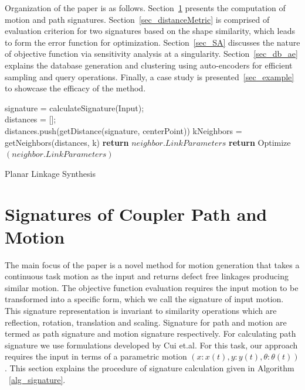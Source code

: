 \documentclass[twocolumn,10pt]{asme2e}
\begin{document}
Organization of the paper is as follows. Section~\ref{sec_sign} presents the computation of motion and path signatures.
Section~\ref{sec_distanceMetric} is comprised of evaluation criterion for two signatures based on the shape similarity, which leads to form the error function for optimization.
Section~\ref{sec_SA} discusses the nature of objective function via sensitivity analysis at a singularity.
Section~\ref{sec_db_ae} explains the database generation and clustering using auto-encoders for efficient sampling and query operations.
Finally, a case study is presented~\ref{sec_example} to showcase the efficacy of the method.

\begin{algorithm}
    signature = calculateSignature(Input); \\
    distances = [];\\
    {
      distances.push(getDistance(signature, centerPoint))
    }
    kNeighbors = getNeighbors(distances, k)
    {
      {
        \textbf{return} $neighbor.LinkParameters$
      }
      {
        \textbf{return} Optimize$(neighbor.LinkParameters)$
      }
    }
    \caption{Planar Linkage Synthesis}
    \label{alg_overall}
\end{algorithm}

\section{Signatures of Coupler Path and Motion}\label{sec_sign}
The main focus of the paper is a novel method for motion generation that takes a continuous task motion as the input and returns defect free linkages producing similar motion.
The objective function evaluation requires the input motion to be transformed into a specific form, which we call the signature of input motion.
This signature representation is invariant to similarity operations which are reflection, rotation, translation and scaling.
Signature for path and motion are termed as path signature and motion signature respectively.
For calculating path signature we use formulations developed by Cui et.al\cite{cui2009}.
For this task, our approach requires the input in terms of a parametric motion $(x:x(t), y:y(t), \theta:\theta(t))$.
This section explains the procedure of signature calculation given in Algorithm ~\ref{alg_signature}.
\end{document}
